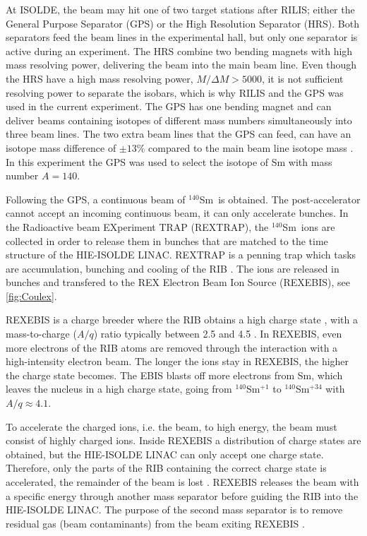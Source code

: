 \documentclass[twoside,english]{uiofysmaster/uiofysmaster}
\newcommand{\Sm}{$^{140}$Sm} %
\let\orgautoref\autoref
\renewcommand{\autoref}
        {%
		 \def\sectionautorefname{Section}%
		 \def\subsectionautorefname{Section}%
		 \def\subsubsectionautorefname{Section}%
		 \def\chapterautorefname{Chapter}%
          \orgautoref}
\begin{document}
At ISOLDE, the beam may hit one of two target stations after RILIS; either the General Purpose Separator (GPS) or the High Resolution Separator (HRS). 
Both separators feed the beam lines in the experimental hall, but only one separator is active during an experiment. 
The HRS combine two bending magnets with high mass resolving power, delivering the beam into the main beam line. 
Even though the HRS have a high mass resolving power, $M/\Delta M > 5000$, it is not sufficient resolving power to separate the isobars, which is why RILIS and the GPS was used in the current experiment.
The GPS has one bending magnet and can deliver beams containing isotopes of different mass numbers simultaneously into three beam lines. 
The two extra beam lines that the GPS can feed, can have an isotope mass difference of $\pm 13 \%$ compared to the main beam line isotope mass \cite{GPS, TIF}.
In this experiment the GPS was used to select the isotope of Sm with mass number $A = 140$. 

Following the GPS, a continuous beam of \Sm\ is obtained. 
The post-accelerator cannot accept an incoming continuous beam, it can only accelerate bunches.
In the Radioactive beam EXperiment TRAP (REXTRAP), the \Sm\ ions are collected in order to release them in bunches that are matched to the time structure of the HIE-ISOLDE LINAC. 
REXTRAP is a penning trap which tasks are accumulation, bunching and cooling of the RIB \cite{HIE-ISOLDE, REXTRAP1, REXTRAP2}. 
The ions are released in bunches and transfered to the REX Electron Beam Ion Source (REXEBIS), see \autoref{fig:Coulex}.

REXEBIS is a charge breeder where the RIB obtains a high charge state \cite{REXEBIS}, with a mass-to-charge ($A/q$) ratio typically between 2.5 and 4.5 \cite{Post-acc}.
In REXEBIS, even more electrons of the RIB atoms are removed through the interaction with a high-intensity electron beam. 
The longer the ions stay in REXEBIS, the higher the charge state becomes. 
The EBIS blasts off more electrons from Sm, which leaves the nucleus in a high charge state, going from \Sm$^{+1}$ to \Sm$^{+34}$ with $A/q \approx 4.1$. 

To accelerate the charged ions, i.e. the beam, to high energy, the beam must consist of highly charged ions. 
Inside REXEBIS a distribution of charge states are obtained, but the HIE-ISOLDE LINAC can only accept one charge state.
Therefore, only the parts of the RIB containing the correct charge state is accelerated, the remainder of the beam is lost \cite{REX-web, HIE-web, EBIS2002, EBIS2010}.
REXEBIS releases the beam with a specific energy through another mass separator before guiding the RIB into the HIE-ISOLDE LINAC. 
The purpose of the second mass separator is to remove residual gas (beam contaminants) from the beam exiting REXEBIS \cite{HIE-ISOLDE}. 
\end{document}
